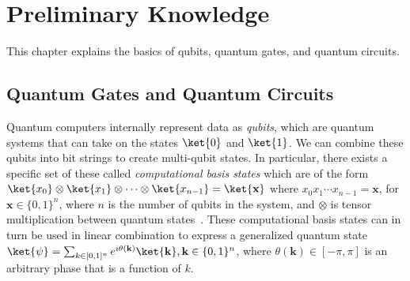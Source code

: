 \section{Preliminary Knowledge}
This chapter explains the basics of qubits, quantum gates, and quantum circuits.

\subsection{Quantum Gates and Quantum Circuits}
\label{Subsec:qubits}
Quantum computers internally represent data as \emph{qubits}, which are quantum systems that can
take on the states $\ket{0}$ and $\ket{1}$.  We can combine these qubits into bit strings to
create multi-qubit states. In particular, there exists a specific set of these called
\emph{computational basis states} which are of the form $\ket{x_0}\otimes\ket{x_1}\otimes\cdots\otimes\ket{x_{n-1}}=\ket{\mathbf{x}}$ where $x_{0}x_{1}\cdots{x_{n-1}}=\mathbf{x}$, for $\mathbf{x} \in \{0,1\}^n$,
where $n$ is the number of qubits in the system, and $\otimes$ is tensor multiplication between quantum states~\cite{nielsen2010quantum}. These computational basis states
can in turn be used in linear combination to express a generalized quantum state
$\ket{\psi} = \sum_{k \in [0,1]^n} e^{i {\theta}(\mathbf{k})} \ket{\mathbf{k}}, \mathbf{k} \in \{0,1\}^n$, where ${\theta}(\mathbf{k})\in [-\pi,\pi]$ is
an arbitrary phase that is a function of $k$. 

